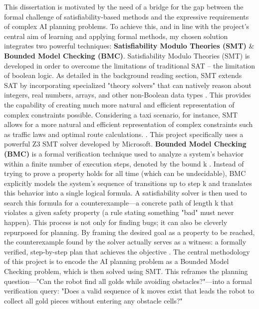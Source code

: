 \documentclass[12pt, a4paper, oneside]{report} %
\begin{document}
This dissertation is motivated by the need of a bridge for the gap between the formal challenge of satisfiability-based methods and the expressive requirements of complex AI planning problems. To achieve this, and in line with the project's central aim of learning and applying formal methods, my chosen solution integrates two powerful techniques:  \textbf{Satisfiability Modulo Theories (SMT)} \& \textbf{Bounded Model Checking (BMC)}. Satisfiability Modulo Theories (SMT) is developed in order to overcome the limitations of traditional SAT -- the limitation of boolean logic. As detailed in the background reading section, SMT extends SAT by incorporating specialized "theory solvers" that can natively reason about integers, real numbers, arrays, and other non-Boolean data types \cite{Barrett2018_Handbook}. This provides the capability of creating much more natural and efficient representation of complex constraints possible. Considering a taxi scenario, for instance, SMT allows for a more natural and efficient representation of complex constraints such as traffic laws and optimal route calculations. \cite{demoura2011smt}. This project specifically uses a powerful Z3 SMT solver developed by Microsoft.
\textbf{Bounded Model Checking (BMC)} is a formal verification technique used to analyze a system's behavior within a finite number of execution steps, denoted by the bound k \cite{Clarke2001_BMC}. Instead of trying to prove a property holds for all time (which can be undecidable), BMC explicitly models the system’s sequence of transitions up to step k and translates this behavior into a single logical formula. A satisfiability solver is then used to search this formula for a counterexample—a concrete path of length k that violates a given safety property (a rule stating something "bad" must never happen). This process is not only for finding bugs; it can also be cleverly repurposed for planning. By framing the desired goal as a property to be reached, the counterexample found by the solver actually serves as a witness: a formally verified, step-by-step plan that achieves the objective \cite{Barrett2018_Handbook}. The central methodology of this project is to encode the AI planning problem as a Bounded Model Checking problem, which is then solved using SMT. This reframes the planning question—"Can the robot find all golds while avoiding obstacles?"—into a formal verification query: "Does a valid sequence of k moves exist that leads the robot to collect all gold pieces without entering any obstacle cells?"
\end{document}
